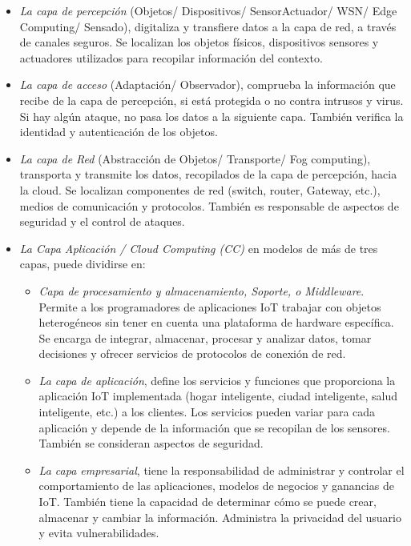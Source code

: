     \begin{itemize}
        \item \textit{La capa de percepción} (Objetos/ Dispositivos/ SensorActuador/ WSN/ Edge Computing/ Sensado), digitaliza y transfiere datos a la capa de red, a través de canales seguros. Se localizan los objetos físicos, dispositivos sensores y actuadores utilizados para recopilar información del contexto.
        \item \textit{La capa de acceso} (Adaptación/ Observador), comprueba la información que recibe de la capa de percepción, si está protegida o no contra intrusos y virus. Si hay algún ataque, no pasa los datos a la siguiente capa. También verifica la identidad y autenticación de los objetos.
        \item \textit{La capa de Red} (Abstracción de Objetos/ Transporte/ Fog computing), transporta y transmite los datos, recopilados de la capa de percepción, hacia la cloud. Se localizan componentes de red (switch, router, Gateway, etc.), medios de comunicación y protocolos. También es responsable de aspectos de seguridad y el control de ataques.
        \item \textit{La Capa Aplicación / Cloud Computing (CC)} en modelos de más de tres capas, puede dividirse en:
            \begin{itemize}
                \item \textit{Capa de procesamiento y almacenamiento, Soporte, o Middleware}. Permite a los programadores de aplicaciones IoT trabajar con objetos heterogéneos sin tener en cuenta una plataforma de hardware específica. Se encarga de integrar, almacenar, procesar y analizar datos, tomar decisiones y ofrecer servicios de protocolos de conexión de red.
                \item \textit{La capa de aplicación}, define los servicios y funciones que proporciona la aplicación IoT implementada (hogar inteligente, ciudad inteligente, salud inteligente, etc.) a los clientes. Los servicios pueden variar para cada aplicación y depende de la información que se recopilan de los sensores. También se consideran aspectos de seguridad.
                \item \textit{La capa empresarial}, tiene la responsabilidad de administrar y controlar el comportamiento de las aplicaciones, modelos de negocios y ganancias de IoT. También tiene la capacidad de determinar cómo se puede crear, almacenar y cambiar la información. Administra la privacidad del usuario y evita vulnerabilidades.
            \end{itemize} 
    \end{itemize}

